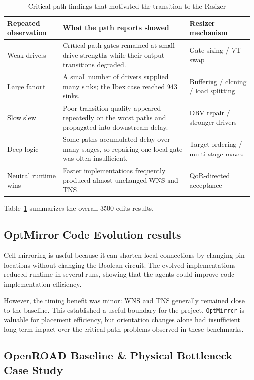 \documentclass[10pt, conference]{IEEEtran}
\begin{document}
\begin{table}[t]
\centering
\caption{Critical-path findings that motivated the transition to the Resizer}
\label{tab:attribution}
\small
\begin{tabular}{@{}p{}p{}p{}@{}}
\toprule
\textbf{Repeated observation} & \textbf{What the path reports showed} & \textbf{Resizer mechanism} \\
\midrule
Weak drivers & Critical-path gates remained at small drive strengths while their output transitions degraded. & Gate sizing / VT swap \\
Large fanout & A small number of drivers supplied many sinks; the Ibex case reached 943 sinks. & Buffering / cloning / load splitting \\
Slow slew & Poor transition quality appeared repeatedly on the worst paths and propagated into downstream delay. & DRV repair / stronger drivers \\
Deep logic & Some paths accumulated delay over many stages, so repairing one local gate was often insufficient. & Target ordering / multi-stage moves \\
Neutral runtime wins & Faster implementations frequently produced almost unchanged WNS and TNS. & QoR-directed acceptance \\
\bottomrule
\end{tabular}
\end{table}

Table~\ref{tab:attribution} summarizes the overall 3500 edits results.

\subsection{OptMirror Code Evolution results}

Cell mirroring is useful because it can shorten local connections by changing pin locations without changing the Boolean circuit. The evolved implementations reduced runtime in several runs, showing that the agents could improve code implementation efficiency.

However, the timing benefit was minor: WNS and TNS generally remained close to the baseline. This established a useful boundary for the project. \texttt{OptMirror} is valuable for placement efficiency, but orientation changes alone had insufficient long-term impact over the critical-path problems observed in these benchmarks.

\subsection{ OpenROAD Baseline \& Physical Bottleneck Case Study}
\end{document}
